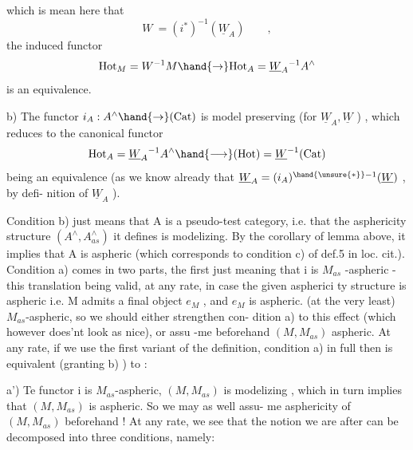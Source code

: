 
which is mean here that
\[ W \ =(i^{*})^{-1}(\underline{W}_A) \qquad , \]
\hand{\uline{\textcolor{black}{and}}} the induced functor
\[ \mathrm{Hot}_M = W^{-1}M \hand{\to} \mathrm{Hot}_A = \underline{W}_A{}^{-1}A^{\wedge} \]
is an equivalence.

b) The functor $i_A : A^{\wedge} \hand{\to} (\mathrm{Cat})$ is model preserving (for $\underline{W}_A,\underline{W}$ ) ,
which reduces to the canonical functor
\[ \mathrm{Hot}_A = \underline{W}_A{}^{-1}A^{\wedge} \hand{\longrightarrow} (\mathrm{Hot}) = \underline{W}^{-1}(\mathrm{Cat}) \]
being an equivalence (as we know already that $\underline{W}_A =(i_A)^{\hand{\unsure{*}}-1}(\underline{W})$ , by defi-%
nition of $\underline{W}_A$ ).

Condition b) just means that A is a pseudo-test category, i.e.
that  the asphericity structure $(A^{\wedge},A^{\wedge}_{as})$ it defines is modelizing.
By the corollary of lemma above, it implies that A is aspheric (which
corresponds to condition c) of def.5 in loc. cit.). Condition a)
comes in two parts, the first just meaning that i is $M_{as}$ -aspheric -
this translation being valid, at any rate, in case  the given aspherici
ty structure is aspheric i.e. M admits a final object $e_M$ , and $e_M$ is
aspheric.  
(at the very least) $M_{as}$-aspheric, so we should either strengthen con-%
dition a) to this effect (which however does'nt look as nice), or assu%
-me beforehand  $(M,M_{as})$ aspheric. At any rate, if we use
the first variant of the definition, condition a) in full then 
is equivalent (granting b) ) to :

a') Te functor i is $M_{as}$-aspheric, \hand{\uline{\textcolor{black}{and}}} $(M,M_{as})$ is modelizing ,
which in turn implies that $(M,M_{as})$ is aspheric. So we may as well assu-%
me asphericity of $(M,M_{as})$ beforehand ! At any rate, we see that the
notion we are after can be decomposed into three conditions, namely:


